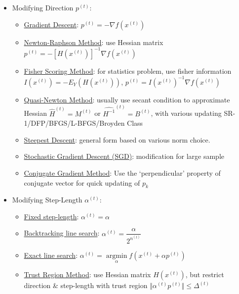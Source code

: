 \begin{itemize}[topsep=2pt,itemsep=0pt]
    \item Modifying Direction $ p^{(t)} $:
    \begin{itemize}[topsep=2pt,itemsep=0pt]
        \item \hyperlink{GradientDescent}{Gradient Descent}: $ p^{(t)}=-\nabla f\left(x^{(t)}\right) $
        \item \hyperlink{NRMethod}{Newton-Raphson Method}: use Hessian matrix $ p^{(t)}=-\left[H(x^{(t)})\right]^{-1}\nabla f\left(x^{(t)}\right) $
        \item \hyperlink{FSNRMethod}{Fisher Scoring Method}: for statistics problem, use fisher information $ I\left(x^{(t)}\right)=-E_Y\left(H(x^{(t)})\right) $, $ p^{(t)}=I\left(x^{(t)}\right)^{-1}\nabla f\left(x^{(t)}\right)  $
        \item \hyperlink{QuasiNewtonMethod}{Quasi-Newton Method}: usually use secant condition to approximate Hessian $ \hat{H}^{(t)}=M^{(t)} $ or $ \hat{H^{-1}}^{(t)}=B^{(t)} $, with various updating SR-1/DFP/BFGS/L-BFGS/Broyden Class
        \item \hyperlink{SteepestDescent}{Steepest Descent}: general form based on various norm choice.
        \item \hyperlink{SGDMethod}{Stochastic Gradient Descent (SGD)}: modification for large sample
        \item \hyperlink{ConjugateGradientMethod}{Conjugate Gradient Method}: Use the `perpendicular' property of conjugate vector for quick updating of $ p_k $
    \end{itemize}
    \item Modifying Step-Length $ \alpha ^{(t)} $:
    \begin{itemize}[topsep=2pt,itemsep=0pt]
        \item \hyperlink{FixedStepLength}{Fixed step-length}: $ \alpha ^{(t)}=\alpha  $
        \item \hyperlink{Backtracking}{Backtracking line search}: $ \alpha ^{(t)}=\dfrac{\alpha }{2^{n^{(t)}}} $ 
        \item \hyperlink{ExactLineSearch}{Exact line search}: $ \alpha ^{(t)}=\mathop{\arg\min}\limits_{\alpha }f\left(x^{(t)}+\alpha p^{(t)}\right)  $
        \item \hyperlink{TrustRegion}{Trust Region Method}: use Hessian matrix $ H(x^{(t)}) $, but restrict direction \& step-length with trust region $ \Vert \alpha ^{(t)}p^{(t)} \Vert\leq \Delta^{(t)}  $
    \end{itemize}

\end{itemize}

